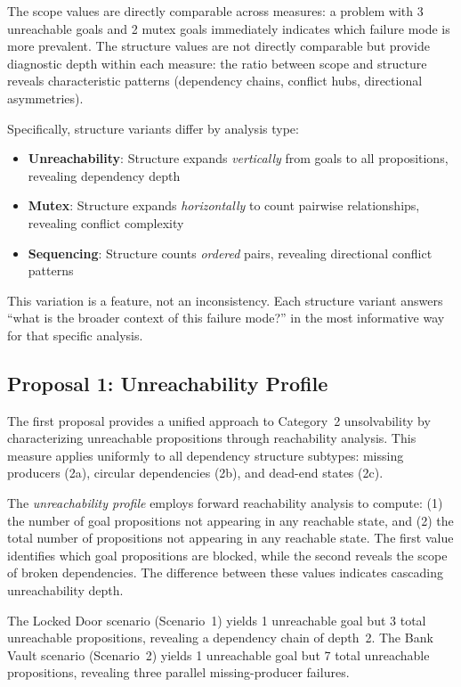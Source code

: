 The scope values are directly comparable across measures: a problem with 3 unreachable goals and 2 mutex goals immediately indicates which failure mode is more prevalent. The structure values are not directly comparable but provide diagnostic depth within each measure: the ratio between scope and structure reveals characteristic patterns (dependency chains, conflict hubs, directional asymmetries).

Specifically, structure variants differ by analysis type:
\begin{itemize}
    \item \textbf{Unreachability}: Structure expands \emph{vertically} from goals to all propositions, revealing dependency depth
    \item \textbf{Mutex}: Structure expands \emph{horizontally} to count pairwise relationships, revealing conflict complexity
    \item \textbf{Sequencing}: Structure counts \emph{ordered} pairs, revealing directional conflict patterns
\end{itemize}

This variation is a feature, not an inconsistency. Each structure variant answers ``what is the broader context of this failure mode?'' in the most informative way for that specific analysis.

\subsection{Proposal 1: Unreachability Profile}
\label{sec:unreachability_profile}

The first proposal provides a unified approach to Category~2 unsolvability by characterizing unreachable propositions through reachability analysis. This measure applies uniformly to all dependency structure subtypes: missing producers (2a), circular dependencies (2b), and dead-end states (2c).

The \emph{unreachability profile} employs forward reachability analysis to compute: (1) the number of goal propositions not appearing in any reachable state, and (2) the total number of propositions not appearing in any reachable state. The first value identifies which goal propositions are blocked, while the second reveals the scope of broken dependencies. The difference between these values indicates cascading unreachability depth.

The Locked Door scenario (Scenario~1) yields 1 unreachable goal but 3 total unreachable propositions, revealing a dependency chain of depth~2. The Bank Vault scenario (Scenario~2) yields 1 unreachable goal but 7 total unreachable propositions, revealing three parallel missing-producer failures.

